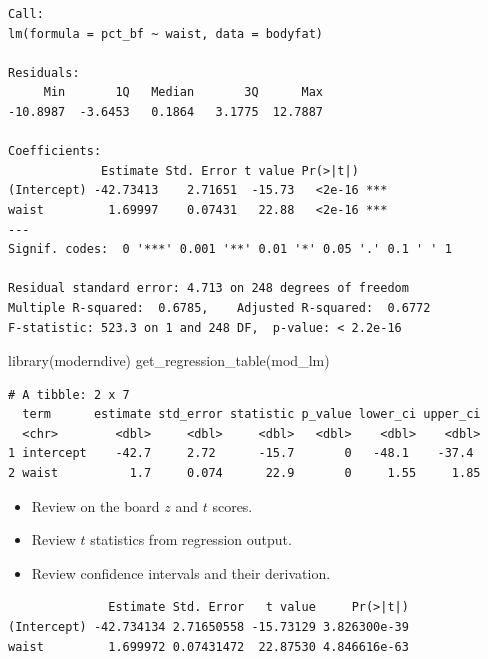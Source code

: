 \documentclass[
]{article}
\newenvironment{Shaded}{\begin{snugshade}}{\end{snugshade}}
\newcommand{\FunctionTok}[1]{\textcolor[rgb]{0.00,0.00,0.00}{#1}}
\newcommand{\NormalTok}[1]{#1}
\newcommand{\SpecialCharTok}[1]{\textcolor[rgb]{0.00,0.00,0.00}{#1}}
\providecommand{\tightlist}{%
  \setlength{\itemsep}{0pt}\setlength{\parskip}{0pt}}
\begin{document}
\begin{verbatim}
Call:
lm(formula = pct_bf ~ waist, data = bodyfat)

Residuals:
     Min       1Q   Median       3Q      Max 
-10.8987  -3.6453   0.1864   3.1775  12.7887 

Coefficients:
             Estimate Std. Error t value Pr(>|t|)    
(Intercept) -42.73413    2.71651  -15.73   <2e-16 ***
waist         1.69997    0.07431   22.88   <2e-16 ***
---
Signif. codes:  0 '***' 0.001 '**' 0.01 '*' 0.05 '.' 0.1 ' ' 1

Residual standard error: 4.713 on 248 degrees of freedom
Multiple R-squared:  0.6785,    Adjusted R-squared:  0.6772 
F-statistic: 523.3 on 1 and 248 DF,  p-value: < 2.2e-16
\end{verbatim}

\begin{Shaded}
\begin{Highlighting}[]
\FunctionTok{library}\NormalTok{(moderndive)}
\FunctionTok{get\_regression\_table}\NormalTok{(mod\_lm)}
\end{Highlighting}
\end{Shaded}

\begin{verbatim}
# A tibble: 2 x 7
  term      estimate std_error statistic p_value lower_ci upper_ci
  <chr>        <dbl>     <dbl>     <dbl>   <dbl>    <dbl>    <dbl>
1 intercept    -42.7     2.72      -15.7       0   -48.1    -37.4 
2 waist          1.7     0.074      22.9       0     1.55     1.85
\end{verbatim}

\begin{itemize}
\tightlist
\item
  Review on the board \(z\) and \(t\) scores.
\item
  Review \(t\) statistics from regression output.
\item
  Review confidence intervals and their derivation.
\end{itemize}

\begin{Shaded}
\end{Shaded}

\begin{verbatim}
              Estimate Std. Error   t value     Pr(>|t|)
(Intercept) -42.734134 2.71650558 -15.73129 3.826300e-39
waist         1.699972 0.07431472  22.87530 4.846616e-63
\end{verbatim}
\end{document}

